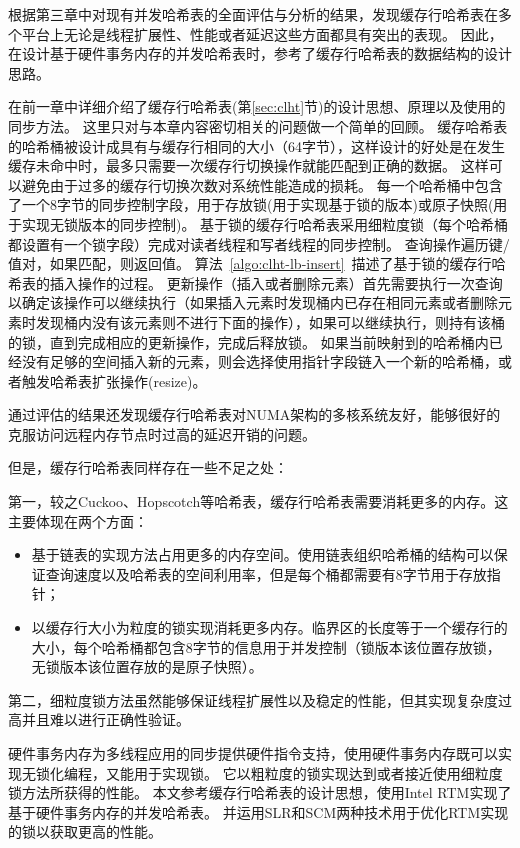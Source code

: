 根据第三章中对现有并发哈希表的全面评估与分析的结果，发现缓存行哈希表在多个平台上无论是线程扩展性、性能或者延迟这些方面都具有突出的表现。
因此，在设计基于硬件事务内存的并发哈希表时，参考了缓存行哈希表的数据结构的设计思路。

在前一章中详细介绍了缓存行哈希表(第\ref{sec:clht}节)的设计思想、原理以及使用的同步方法。
这里只对与本章内容密切相关的问题做一个简单的回顾。
缓存哈希表的哈希桶被设计成具有与缓存行相同的大小（64字节），这样设计的好处是在发生缓存未命中时，最多只需要一次缓存行切换操作就能匹配到正确的数据。
这样可以避免由于过多的缓存行切换次数对系统性能造成的损耗。
每一个哈希桶中包含了一个8字节的同步控制字段，用于存放锁(用于实现基于锁的版本)或原子快照(用于实现无锁版本的同步控制)。
基于锁的缓存行哈希表采用细粒度锁（每个哈希桶都设置有一个锁字段）完成对读者线程和写者线程的同步控制。
查询操作遍历键/值对，如果匹配，则返回值。
算法~\ref{algo:clht-lb-insert}~描述了基于锁的缓存行哈希表的插入操作的过程。
更新操作（插入或者删除元素）首先需要执行一次查询以确定该操作可以继续执行（如果插入元素时发现桶内已存在相同元素或者删除元素时发现桶内没有该元素则不进行下面的操作），如果可以继续执行，则持有该桶的锁，直到完成相应的更新操作，完成后释放锁。
如果当前映射到的哈希桶内已经没有足够的空间插入新的元素，则会选择使用指针字段链入一个新的哈希桶，或者触发哈希表扩张操作(resize)。

通过评估的结果还发现缓存行哈希表对NUMA架构的多核系统友好，能够很好的克服访问远程内存节点时过高的延迟开销的问题。

但是，缓存行哈希表同样存在一些不足之处：

第一，较之Cuckoo、Hopscotch等哈希表，缓存行哈希表需要消耗更多的内存。这主要体现在两个方面：
\begin{itemize}
\item 基于链表的实现方法占用更多的内存空间。使用链表组织哈希桶的结构可以保证查询速度以及哈希表的空间利用率，但是每个桶都需要有8字节用于存放指针；
\item 以缓存行大小为粒度的锁实现消耗更多内存。临界区的长度等于一个缓存行的大小，每个哈希桶都包含8字节的信息用于并发控制（锁版本该位置存放锁，无锁版本该位置存放的是原子快照）。
\end{itemize}

第二，细粒度锁方法虽然能够保证线程扩展性以及稳定的性能，但其实现复杂度过高并且难以进行正确性验证。

硬件事务内存为多线程应用的同步提供硬件指令支持，使用硬件事务内存既可以实现无锁化编程，又能用于实现锁。
它以粗粒度的锁实现达到或者接近使用细粒度锁方法所获得的性能。
本文参考缓存行哈希表的设计思想，使用Intel RTM实现了基于硬件事务内存的并发哈希表。
并运用SLR和SCM两种技术用于优化RTM实现的锁以获取更高的性能。

